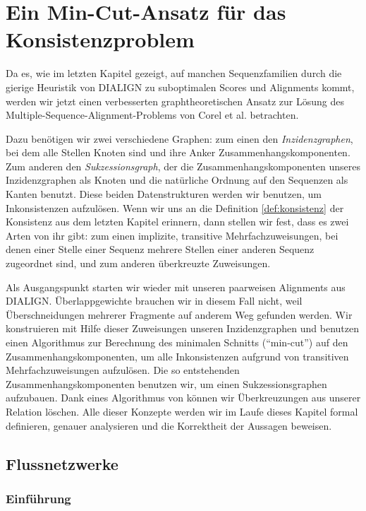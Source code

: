 \chapter{Ein Min-Cut-Ansatz für das Konsistenzproblem}
\label{ch:min-cut}
Da es, wie im letzten Kapitel gezeigt, auf manchen Sequenzfamilien durch die gierige Heuristik von DIALIGN zu suboptimalen Scores und Alignments kommt, werden wir jetzt einen verbesserten graphtheoretischen Ansatz zur Lösung des Multiple-Sequence-Alignment-Problems von Corel et al. betrachten\cite{cpm10}.

Dazu benötigen wir zwei verschiedene Graphen: zum einen den \emph{Inzidenzgraphen}, bei dem alle Stellen Knoten sind und ihre Anker Zusammenhangskomponenten. Zum anderen den \emph{Sukzessionsgraph}, der die Zusammenhangskomponenten unseres Inzidenzgraphen als Knoten und die natürliche Ordnung auf den Sequenzen als Kanten benutzt. Diese beiden Datenstrukturen werden wir benutzen, um Inkonsistenzen aufzulösen. Wenn wir uns an die Definition \ref{def:konsistenz} der Konsistenz aus dem letzten Kapitel erinnern, dann stellen wir fest, dass es zwei Arten von ihr gibt: zum einen implizite, transitive Mehrfachzuweisungen, bei denen einer Stelle einer Sequenz mehrere Stellen einer anderen Sequenz zugeordnet sind, und zum anderen überkreuzte Zuweisungen.

Als Ausgangspunkt starten wir wieder mit unseren paarweisen Alignments aus DIALIGN. Überlappgewichte brauchen wir in diesem Fall nicht, weil Überschneidungen mehrerer Fragmente auf anderem Weg gefunden werden. Wir konstruieren mit Hilfe dieser Zuweisungen unseren Inzidenzgraphen und benutzen einen Algorithmus zur Berechnung des minimalen Schnitts (\enquote{min-cut}) auf den Zusammenhangskomponenten, um alle Inkonsistenzen aufgrund von transitiven Mehrfachzuweisungen aufzulösen. Die so entstehenden Zusammenhangskomponenten benutzen wir, um einen Sukzessionsgraphen aufzubauen. Dank eines Algorithmus von \cite{pdc10} können wir Überkreuzungen aus unserer Relation löschen. Alle dieser Konzepte werden wir im Laufe dieses Kapitel formal definieren, genauer analysieren und die Korrektheit der Aussagen beweisen.
 
\section{Flussnetzwerke}

\subsection{Einführung}

